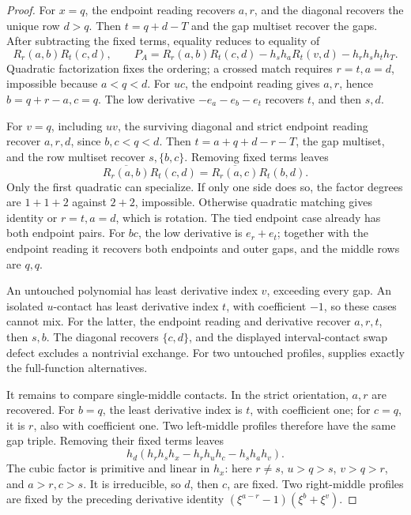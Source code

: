 \documentclass[11pt,a4paper]{amsart}
\numberwithin{equation}{section}
\theoremstyle{plain}
\theoremstyle{definition}
\begin{document}
\begin{proof}
For \(x=q\), the endpoint reading recovers \(a,r\), and the diagonal
recovers the unique row \(d>q\).  Then \(t=q+d-T\) and the gap
multiset recover the gaps.  After subtracting the fixed terms, equality
reduces to equality of
\[
 R_r(a,b)R_t(c,d),
 \qquad
 P_A=R_r(a,b)R_t(c,d)-h_sh_aR_t(v,d)-h_rh_sh_th_T.
\]
Quadratic factorization fixes the ordering; a crossed match requires
\(r=t,a=d\), impossible because \(a<q<d\).
For \(uc\), the endpoint reading gives \(a,r\), hence
\(b=q+r-a,c=q\).  The low derivative
\(-e_a-e_b-e_t\) recovers \(t\), and then \(s,d\).

For \(v=q\), including \(uv\), the surviving diagonal and strict
endpoint reading recover \(a,r,d\), since \(b,c<q<d\).  Then
\(t=a+q+d-r-T\), the gap multiset, and the row multiset recover
\(s,\{b,c\}\).  Removing fixed terms leaves
\[
 \overline{R_r(a,b)}R_t(c,d)
 =\overline{R_r(a,c)}R_t(b,d).
\]
Only the first quadratic can specialize.  If only one side does so, the
factor degrees are \(1+1+2\) against \(2+2\), impossible.  Otherwise
quadratic matching gives identity or \(r=t,a=d\), which is rotation.
The tied endpoint case already has both endpoint pairs.  For \(bc\),
the low derivative is \(e_r+e_t\); together with the endpoint reading
it recovers both endpoints and outer gaps, and the middle rows are \(q,q\).

An untouched polynomial has least derivative index \(v\), exceeding
every gap.  An isolated \(u\)-contact has least derivative index \(t\),
with coefficient \(-1\), so these cases cannot mix.  For the latter,
the endpoint reading and derivative recover \(a,r,t\), then \(s,b\).
The diagonal recovers \(\{c,d\}\), and the displayed interval-contact
swap defect excludes a nontrivial exchange.  For two untouched profiles,
 supplies exactly the full-function alternatives.

It remains to compare single-middle contacts.  In the strict orientation,
\(a,r\) are recovered.  For \(b=q\), the least derivative index is
\(t\), with coefficient one; for \(c=q\), it is \(r\), also with
coefficient one.  Two left-middle profiles therefore have the same gap
triple.  Removing their fixed terms leaves
\[
 h_d(h_rh_sh_x-h_rh_uh_c-h_sh_ah_v).
\]
The cubic factor is primitive and linear in \(h_x\): here
\(r\ne s\), \(u>q>s\), \(v>q>r\), and \(a>r,c>s\).
It is irreducible, so \(d\), then \(c\), are fixed.
Two right-middle profiles are fixed by the preceding derivative identity
\((\xi^{a-r}-1)(\xi^b+\xi^v)\).


\end{proof}
\end{document}
